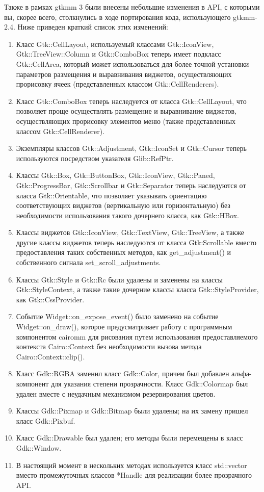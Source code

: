Также в рамках gtkmm 3 были внесены небольшие изменения в API, с которыми вы, скорее всего, столкнулись в ходе портирования кода, использующего gtkmm-2.4. Ниже приведен краткий список этих изменений:
\begin{enumerate}

\item Класс Gtk::CellLayout, используемый классами Gtk::IconView, Gtk::TreeView::Column и Gtk::ComboBox теперь имеет подкласс Gtk::CellArea, который может использоваться для более точной установки параметров размещения и выравнивания виджетов, осуществляющих прорисовку ячеек (представленных классом Gtk::CellRenderers).
\item Класс Gtk::ComboBox теперь наследуется от класса Gtk::CellLayout, что позволяет проще осуществлять размещение и выравнивание виджетов, осуществляющих прорисовку элементов меню (также представленных классом Gtk::CellRenderer).
\item Экземпляры классов Gtk::Adjustment, Gtk::IconSet и Gtk::Cursor теперь используются посредством указателя Glib::RefPtr.
\item Классы Gtk::Box, Gtk::ButtonBox, Gtk::IconView, Gtk::Paned, Gtk::ProgressBar, Gtk::Scrollbar и Gtk::Separator теперь наследуются от класса Gtk::Orientable, что позволяет указывать ориентацию соответствующих виджетов (вертикальную или горизонтальную) без необходимости использования такого дочернего класса, как Gtk::HBox.

\item Классы виджетов Gtk::IconView, Gtk::TextView, Gtk::TreeView, а также другие классы виджетов теперь наследуются от класса Gtk:Scrollable вместо предоставления таких собственных методов, как get\_adjustment() и собственного сигнала set\_scroll\_adjustments.
\item Классы Gtk::Style и Gtk::Rc были удалены и заменены на классы Gtk::StyleContext, а также такие дочерние классы класса Gtk::StyleProvider, как Gtk::CssProvider.
\item Событие Widget::on\_expose\_event() было заменено на событие Widget::on\_draw(), которое предусматривает работу с программным компонентом cairomm для рисования путем использования предоставляемого контекста Cairo::Context без необходимости вызова метода Cairo::Context::clip().
\item Класс Gdk::RGBA заменил класс Gdk::Color, причем был добавлен альфа-компонент для указания степени прозрачности. Класс Gdk::Colormap был удален вместе с неудачным механизмом резервирования цветов.
\item Классы Gdk::Pixmap и Gdk::Bitmap были удалены; на их замену пришел класс Gdk::Pixbuf.
\item Класс Gdk::Drawable был удален; его методы были перемещены в класс Gdk::Window.
\item В настоящий момент в нескольких методах используется класс std::vector вместо промежуточных классов *Handle для реализации более прозрачного API.
\end{enumerate}

